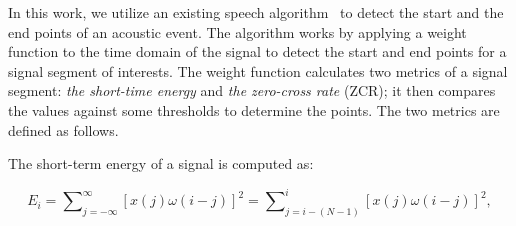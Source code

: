 %
%
%
%



 In this work, we utilize an existing speech algorithm~\cite{endpoint2008} to detect
the start and the end points of an acoustic event. The algorithm works by applying a weight function to the time domain of the signal to
detect the start and end points for a signal segment of interests. The weight function calculates two metrics of a signal segment:
\emph{the short-time energy} and \emph{the zero-cross rate} (ZCR); it then compares the values against some thresholds to determine the
points. The two metrics are defined as follows.

The short-term energy of a signal is computed as:

\begin{equation}
  E_i=\sum\nolimits_{j=-\infty}^{\infty}[x(j)\omega(i-j)]^2=\sum\nolimits_{j=i-(N-1)}^{i}[x(j)\omega(i-j)]^2,
  \label{eq:shorte}
\end{equation}

